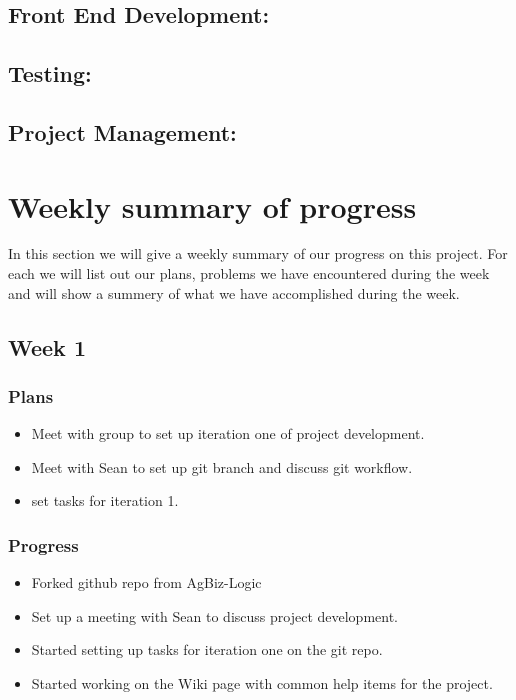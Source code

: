 \documentclass[onecolumn, draftclsnofoot,10pt, compsoc]{article}
\begin{document}
		
		
		\subsection{Front End Development:}
		
		\subsection{Testing:}
		
		\subsection{Project Management:}
	
\section{Weekly summary of progress}
	   In this section we will give a weekly summary of our progress on this project. For each we will list out our plans, problems we have encountered during the week and will show a summery of what we have accomplished during the week.\\

		\subsection{Week 1}
			\subsubsection{Plans}
				\begin{itemize}
					\item Meet with group to set up iteration one of project development.
					\item Meet with Sean to set up git branch and discuss git workflow.
					\item set tasks for iteration 1.
				\end{itemize}

			\subsubsection{Progress}
				\begin{itemize}
					\item Forked github repo from AgBiz-Logic
					\item Set up a meeting with Sean to discuss project development.
					\item Started setting up tasks for iteration one on the git repo.
					\item Started working on the Wiki page with common help items for the project.
				\end{itemize}
\end{document}
